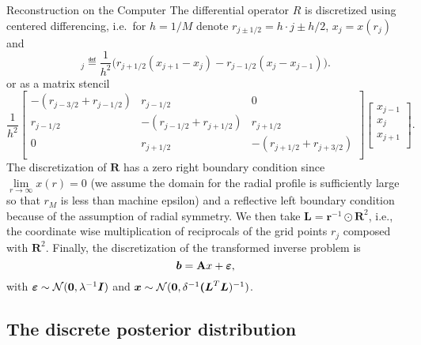 \begin{chapter}{Reconstruction on the Computer}
The differential operator $R$ is discretized using centered differencing, i.e.~for $h = 1/M$ denote $r_{j\pm1/2} = h\cdot j \pm h/2$, $x_j = x(r_j)$ and
\begin{equation}
  [\bm R \bm x]_j \eqdef \frac{1}{h^2} \Big( r_{j+1/2}(x_{j+1} - x_j) - r_{j-1/2}(x_{j} - x_{j-1})\Big).
  \label{laplacian_discretization}
\end{equation}
or as a matrix stencil
\begin{equation}
  \frac{1}{h^2}
  \left[\begin{array}{ccc}
    -(r_{j-3/2} + r_{j-1/2}) & r_{j-1/2} & 0             \\
    r_{j-1/2} & -(r_{j-1/2} + r_{j+1/2}) & r_{j+1/2}     \\
    0 & r_{j+1/2} & -(r_{j+1/2} + r_{j+3/2}) \\
  \end{array}\right]
  \left[\begin{array}{c}
    x_{j-1} \\
    x_{j}   \\
    x_{j+1} \\
  \end{array}\right].
  \label{laplacian_discretization_stencil}
\end{equation}
The discretization of $\bm R$ has a zero right boundary condition since $\lim\limits_{r\to\infty}x(r) = 0$ (we assume the domain for the radial profile is sufficiently large so that $r_M$ is less than machine epsilon) and a reflective left boundary condition because of the assumption of radial symmetry.
We then take $\bm L = \bm r^{-1} \odot \bm R^2$, i.e., the coordinate wise multiplication of reciprocals of the grid points $r_j$ composed with $\bm R^2$.
Finally, the discretization of the transformed inverse problem is
\begin{equation}\label{eq:psfDiscInvProblem}
  \mbox{\boldmath$b$} = {\bf A} x + \mbox{\boldmath$\varepsilon$},
\end{equation}
with $\mbox{\boldmath$\varepsilon$} \sim \mathcal{N}(\mbox{\boldmath$0$}, \lambda^{-1} \mbox{\boldmath$I$})$ and $\mbox{\boldmath$x$} \sim \mathcal{N}( \mbox{\boldmath$0$}, \delta^{-1} \mbox{\boldmath$($}\mbox{\boldmath$L$}^T\mbox{\boldmath$L$})^{-1})$.
  \subsection{The discrete posterior distribution}

\end{chapter}

